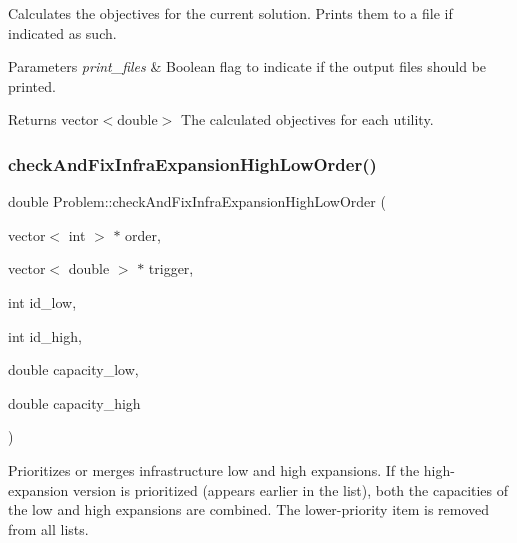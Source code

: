 Calculates the objectives for the current solution. Prints them to a file if indicated as such. 


\begin{DoxyParams}{Parameters}
{\em print\+\_\+files} & Boolean flag to indicate if the output files should be printed. \\
\hline
\end{DoxyParams}
\begin{DoxyReturn}{Returns}
vector$<$double$>$ The calculated objectives for each utility. 
\end{DoxyReturn}
\mbox{\label{classProblem_ab9750751c2d4468a3dfe5dd6573b5179}} 
\subsubsection{\texorpdfstring{check\+And\+Fix\+Infra\+Expansion\+High\+Low\+Order()}{checkAndFixInfraExpansionHighLowOrder()}}
{\footnotesize\ttfamily double Problem\+::check\+And\+Fix\+Infra\+Expansion\+High\+Low\+Order (\begin{DoxyParamCaption}\item[{vector$<$ int $>$ $\ast$}]{order,  }\item[{vector$<$ double $>$ $\ast$}]{trigger,  }\item[{int}]{id\+\_\+low,  }\item[{int}]{id\+\_\+high,  }\item[{double}]{capacity\+\_\+low,  }\item[{double}]{capacity\+\_\+high }\end{DoxyParamCaption})\hspace{0.3cm}{\ttfamily [protected]}}



Prioritizes or merges infrastructure low and high expansions. If the high-\/expansion version is prioritized (appears earlier in the list), both the capacities of the low and high expansions are combined. The lower-\/priority item is removed from all lists. 


